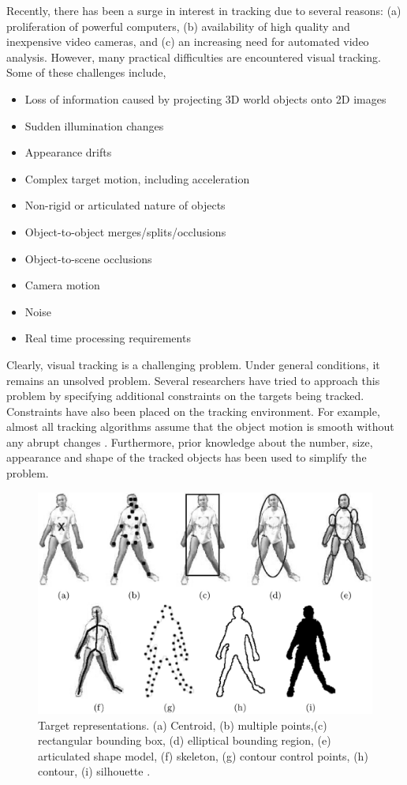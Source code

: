 Recently, there has been a surge in interest in tracking due to several reasons: (a) proliferation of powerful computers, (b) availability of high quality and inexpensive video cameras, and (c) an increasing need for automated video analysis.  However, many practical difficulties are encountered visual tracking.  Some of these challenges include, 

\begin{itemize}
\item Loss of information caused by projecting 3D world objects onto 2D images
\item Sudden illumination changes
\item Appearance drifts
\item Complex target motion, including acceleration
\item Non-rigid or articulated nature of objects
\item Object-to-object merges/splits/occlusions
\item Object-to-scene occlusions
\item Camera motion
\item Noise
\item Real time processing requirements
\end{itemize} 

Clearly, visual tracking is a challenging problem.  Under general conditions, it remains an unsolved problem.  Several researchers have tried to approach this problem by specifying additional constraints on the targets being tracked.  Constraints have also been placed on the tracking environment.  For example, almost all tracking algorithms assume that the object motion is smooth without any abrupt changes \cite{2006_JNL_SURVEYtrk_Yilmaz}.  Furthermore, prior knowledge about the number, size, appearance and shape of the tracked objects has been used to simplify the problem.  

\begin{figure}[t]
	\center
	\includegraphics[width=1.0\textwidth]{thesis/2006_JNL_TRKsurvey_Shah_fig1.png}
	\caption{Target representations.  (a) Centroid, (b) multiple points,(c) rectangular bounding box, (d) elliptical bounding region, (e) articulated shape model, (f) skeleton, (g) contour control points, (h) contour, (i) silhouette \cite{2006_JNL_SURVEYtrk_Yilmaz}.}
	\label{fig:TRK_objectRepresentations}
\end{figure}

